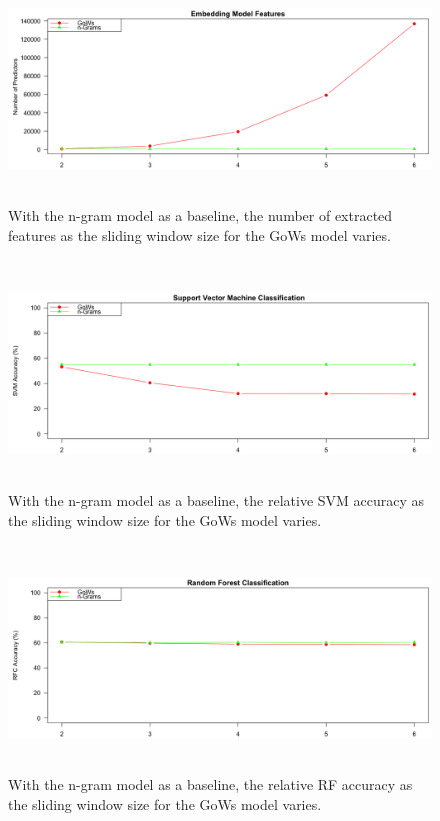 \documentclass[twoside,twocolumn]{article}
\begin{document}
\begin{figure}
  \caption{With the n-gram model as a baseline, the number of extracted features as the sliding window size for the GoWs model varies.}
  \includegraphics[width=\textwidth,height=6cm]{Feature_Results.png}
\end{figure}

\begin{figure}
  \caption{With the n-gram model as a baseline, the relative SVM accuracy as the sliding window size for the GoWs model varies.}
  \includegraphics[width=\textwidth,height=6cm]{SVM_Results.png}
\end{figure}

\begin{figure}
  \caption{With the n-gram model as a baseline, the relative RF accuracy as the sliding window size for the GoWs model varies.}
  \includegraphics[width=\textwidth,height=6cm]{RFC_Results.png}
\end{figure}
\end{document}
